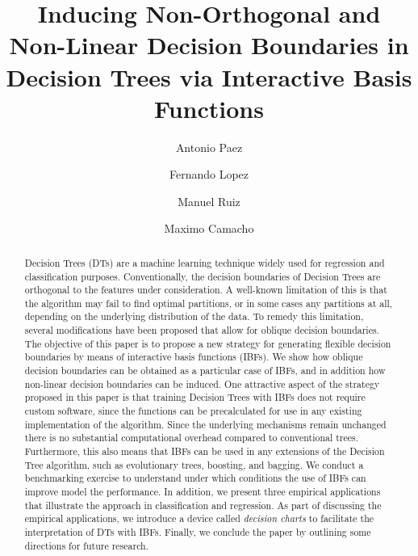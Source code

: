 \documentclass[]{elsarticle} %
\begin{document}
\begin{frontmatter}

  \title{Inducing Non-Orthogonal and Non-Linear Decision Boundaries in Decision
Trees via Interactive Basis Functions}
    \author[McMaster University]{Antonio Paez}
    \author[Universidad Politecnica de Cartagena]{Fernando Lopez}
  
    \author[Universidad Politecnica de Cartagena]{Manuel Ruiz}
  
    \author[Universidad de Murcia]{Maximo Camacho}
  
      \address[McMaster University]{School of Geography and Earth Sciences, 1280 Main Street West, Hamilton
ON, Canada L8S 4K1}
    \address[Universidad Politecnica de Cartagena]{Facultad de Ciencias de la Empresa, Dept. de Métodos Cuantitativos e
Informáticos, Calle Real, 3, 30201 Cartagena, Murcia, España}
    \address[Universidad de Murcia]{Facultad de Economía y Empresa, Dept. de Métodos Cuantitativos para la
Economía y la Empresa, 30100 Murcia, Murcia, España}
  
  \begin{abstract}
  Decision Trees (DTs) are a machine learning technique widely used for
  regression and classification purposes. Conventionally, the decision
  boundaries of Decision Trees are orthogonal to the features under
  consideration. A well-known limitation of this is that the algorithm may
  fail to find optimal partitions, or in some cases any partitions at all,
  depending on the underlying distribution of the data. To remedy this
  limitation, several modifications have been proposed that allow for
  oblique decision boundaries. The objective of this paper is to propose a
  new strategy for generating flexible decision boundaries by means of
  interactive basis functions (IBFs). We show how oblique decision
  boundaries can be obtained as a particular case of IBFs, and in addition
  how non-linear decision boundaries can be induced. One attractive aspect
  of the strategy proposed in this paper is that training Decision Trees
  with IBFs does not require custom software, since the functions can be
  precalculated for use in any existing implementation of the algorithm.
  Since the underlying mechanisms remain unchanged there is no substantial
  computational overhead compared to conventional trees. Furthermore, this
  also means that IBFs can be used in any extensions of the Decision Tree
  algorithm, such as evolutionary trees, boosting, and bagging. We conduct
  a benchmarking exercise to understand under which conditions the use of
  IBFs can improve model the performance. In addition, we present three
  empirical applications that illustrate the approach in classification
  and regression. As part of discussing the empirical applications, we
  introduce a device called \emph{decision charts} to facilitate the
  interpretation of DTs with IBFs. Finally, we conclude the paper by
  outlining some directions for future research.
  \end{abstract}
  
 \end{frontmatter}
\end{document}
